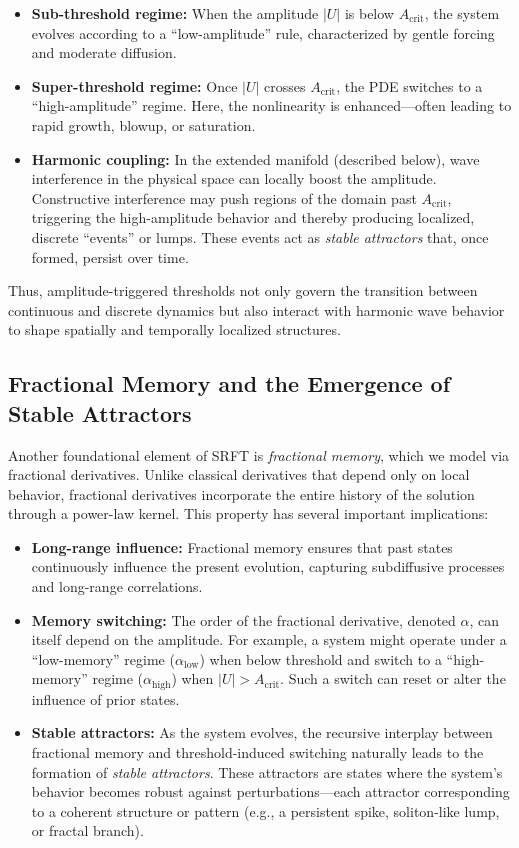 \documentclass[12pt]{article}
\begin{document}
\begin{itemize}
    \item \textbf{Sub-threshold regime:} When the amplitude $|U|$ is below $A_{\mathrm{crit}}$, the system evolves according to a “low-amplitude” rule, characterized by gentle forcing and moderate diffusion.
    \item \textbf{Super-threshold regime:} Once $|U|$ crosses $A_{\mathrm{crit}}$, the PDE switches to a “high-amplitude” regime. Here, the nonlinearity is enhanced—often leading to rapid growth, blowup, or saturation.
    \item \textbf{Harmonic coupling:} In the extended manifold (described below), wave interference in the physical space can locally boost the amplitude. Constructive interference may push regions of the domain past $A_{\mathrm{crit}}$, triggering the high-amplitude behavior and thereby producing localized, discrete “events” or lumps. These events act as \emph{stable attractors} that, once formed, persist over time.
\end{itemize}

Thus, amplitude-triggered thresholds not only govern the transition between continuous and discrete dynamics but also interact with harmonic wave behavior to shape spatially and temporally localized structures.

\medskip

\subsection{Fractional Memory and the Emergence of Stable Attractors}
Another foundational element of SRFT is \emph{fractional memory}, which we model via fractional derivatives. Unlike classical derivatives that depend only on local behavior, fractional derivatives incorporate the entire history of the solution through a power-law kernel. This property has several important implications:

\begin{itemize}
    \item \textbf{Long-range influence:} Fractional memory ensures that past states continuously influence the present evolution, capturing subdiffusive processes and long-range correlations.
    \item \textbf{Memory switching:} The order of the fractional derivative, denoted $\alpha$, can itself depend on the amplitude. For example, a system might operate under a “low-memory” regime ($\alpha_{\mathrm{low}}$) when below threshold and switch to a “high-memory” regime ($\alpha_{\mathrm{high}}$) when $|U| > A_{\mathrm{crit}}$. Such a switch can reset or alter the influence of prior states.
    \item \textbf{Stable attractors:} As the system evolves, the recursive interplay between fractional memory and threshold-induced switching naturally leads to the formation of \emph{stable attractors}. These attractors are states where the system’s behavior becomes robust against perturbations—each attractor corresponding to a coherent structure or pattern (e.g., a persistent spike, soliton-like lump, or fractal branch).
\end{itemize}
\end{document}
